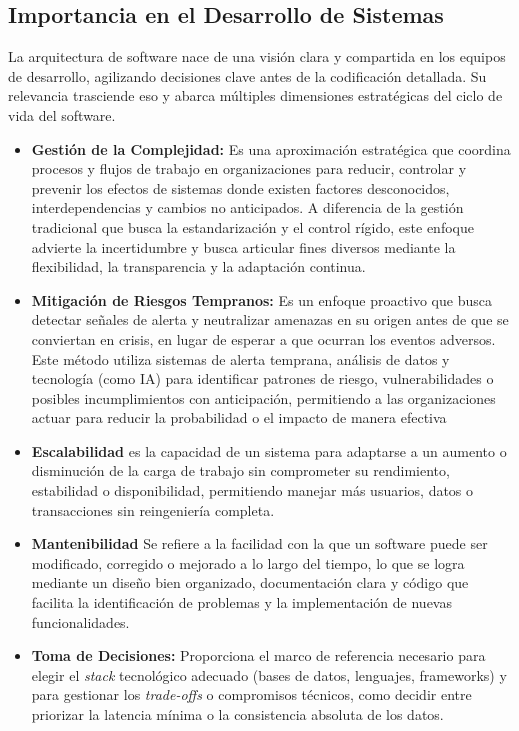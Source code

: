 \subsection{Importancia en el Desarrollo de Sistemas}

La arquitectura de software nace de una visión clara y compartida en los equipos de desarrollo, agilizando decisiones clave antes de la codificación detallada. Su relevancia trasciende eso y abarca múltiples dimensiones estratégicas del ciclo de vida del software.
\begin{itemize}
\item \textbf{Gestión de la Complejidad:} Es una aproximación estratégica que coordina procesos y flujos de trabajo en organizaciones para reducir, controlar y prevenir los efectos de sistemas donde existen factores desconocidos, interdependencias y cambios no anticipados.  A diferencia de la gestión tradicional que busca la estandarización y el control rígido, este enfoque advierte la incertidumbre y busca articular fines diversos mediante la flexibilidad, la transparencia y la adaptación continua.

\item \textbf{Mitigación de Riesgos Tempranos:} Es un enfoque proactivo que busca detectar señales de alerta y neutralizar amenazas en su origen antes de que se conviertan en crisis, en lugar de esperar a que ocurran los eventos adversos.  Este método utiliza sistemas de alerta temprana, análisis de datos y tecnología (como IA) para identificar patrones de riesgo, vulnerabilidades o posibles incumplimientos con anticipación, permitiendo a las organizaciones actuar para reducir la probabilidad o el impacto de manera efectiva

\item \textbf{Escalabilidad} es la capacidad de un sistema para adaptarse a un aumento o disminución de la carga de trabajo sin comprometer su rendimiento, estabilidad o disponibilidad, permitiendo manejar más usuarios, datos o transacciones sin reingeniería completa. 

\item \textbf{Mantenibilidad} Se refiere a la facilidad con la que un software puede ser modificado, corregido o mejorado a lo largo del tiempo, lo que se logra mediante un diseño bien organizado, documentación clara y código que facilita la identificación de problemas y la implementación de nuevas funcionalidades. 

\item \textbf{Toma de Decisiones:} Proporciona el marco de referencia necesario para elegir el \textit{stack} tecnológico adecuado (bases de datos, lenguajes, frameworks) y para gestionar los \textit{trade-offs} o compromisos técnicos, como decidir entre priorizar la latencia mínima o la consistencia absoluta de los datos.

\end{itemize}

